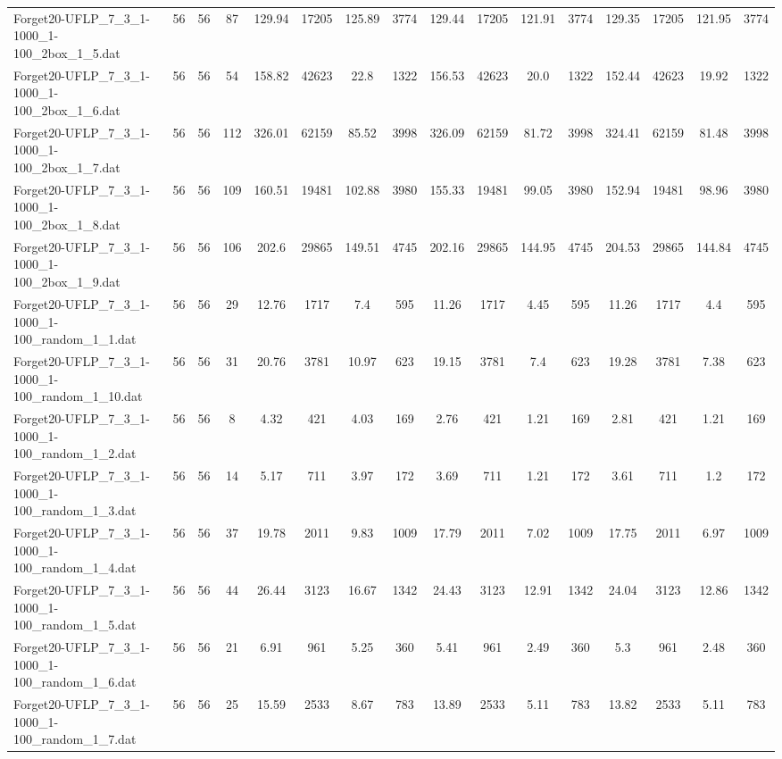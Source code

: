 \begin{sidewaystable}[!ht]
{\begin{tabular}{lccccccccccccccc}
Forget20-UFLP\_7\_3\_1-1000\_1-100\_2box\_1\_5.dat & 56 & 56 & 87 & 129.94 & 17205 & 125.89 & 3774 & 129.44 & 17205 & 121.91 & 3774 & 129.35 & 17205 & 121.95 & 3774 \\
Forget20-UFLP\_7\_3\_1-1000\_1-100\_2box\_1\_6.dat & 56 & 56 & 54 & 158.82 & 42623 & 22.8 & 1322 & 156.53 & 42623 & 20.0 & 1322 & 152.44 & 42623 & 19.92 & 1322 \\
Forget20-UFLP\_7\_3\_1-1000\_1-100\_2box\_1\_7.dat & 56 & 56 & 112 & 326.01 & 62159 & 85.52 & 3998 & 326.09 & 62159 & 81.72 & 3998 & 324.41 & 62159 & 81.48 & 3998 \\
Forget20-UFLP\_7\_3\_1-1000\_1-100\_2box\_1\_8.dat & 56 & 56 & 109 & 160.51 & 19481 & 102.88 & 3980 & 155.33 & 19481 & 99.05 & 3980 & 152.94 & 19481 &  \textcolor{blue2}{98.96} & 3980 \\
Forget20-UFLP\_7\_3\_1-1000\_1-100\_2box\_1\_9.dat & 56 & 56 & 106 & 202.6 & 29865 & 149.51 & 4745 & 202.16 & 29865 & 144.95 & 4745 & 204.53 & 29865 & 144.84 & 4745 \\
Forget20-UFLP\_7\_3\_1-1000\_1-100\_random\_1\_1.dat & 56 & 56 & 29 & 12.76 & 1717 & 7.4 & 595 & 11.26 & 1717 & 4.45 & 595 & 11.26 & 1717 & 4.4 & 595 \\
Forget20-UFLP\_7\_3\_1-1000\_1-100\_random\_1\_10.dat & 56 & 56 & 31 & 20.76 & 3781 & 10.97 & 623 & 19.15 & 3781 & 7.4 & 623 & 19.28 & 3781 & 7.38 & 623 \\
Forget20-UFLP\_7\_3\_1-1000\_1-100\_random\_1\_2.dat & 56 & 56 & 8 & 4.32 & 421 & 4.03 & 169 & 2.76 & 421 & 1.21 & 169 & 2.81 & 421 & 1.21 & 169 \\
Forget20-UFLP\_7\_3\_1-1000\_1-100\_random\_1\_3.dat & 56 & 56 & 14 & 5.17 & 711 & 3.97 & 172 & 3.69 & 711 & 1.21 & 172 & 3.61 & 711 & 1.2 & 172 \\
Forget20-UFLP\_7\_3\_1-1000\_1-100\_random\_1\_4.dat & 56 & 56 & 37 & 19.78 & 2011 & 9.83 & 1009 & 17.79 & 2011 & 7.02 & 1009 & 17.75 & 2011 &  \textcolor{blue2}{6.97} & 1009 \\
Forget20-UFLP\_7\_3\_1-1000\_1-100\_random\_1\_5.dat & 56 & 56 & 44 & 26.44 & 3123 & 16.67 & 1342 & 24.43 & 3123 & 12.91 & 1342 & 24.04 & 3123 &  \textcolor{blue2}{12.86} & 1342 \\
Forget20-UFLP\_7\_3\_1-1000\_1-100\_random\_1\_6.dat & 56 & 56 & 21 & 6.91 & 961 & 5.25 & 360 & 5.41 & 961 & 2.49 & 360 & 5.3 & 961 & 2.48 & 360 \\
Forget20-UFLP\_7\_3\_1-1000\_1-100\_random\_1\_7.dat & 56 & 56 & 25 & 15.59 & 2533 & 8.67 & 783 & 13.89 & 2533 &  \textcolor{blue2}{5.11} & 783 & 13.82 & 2533 &  \textcolor{blue2}{5.11} & 783 \\

\end{tabular}}
\end{sidewaystable}
